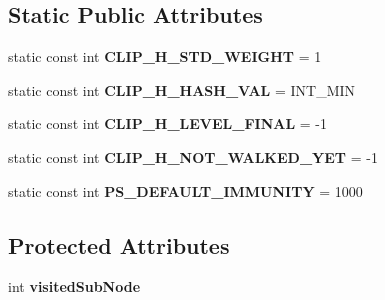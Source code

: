 \subsection*{Static Public Attributes}
\begin{DoxyCompactItemize}
\item 
\hypertarget{classkukadu_1_1Clip_a52b125d5ca75e6c980c4efb63e18ae4e}{static const int {\bfseries C\-L\-I\-P\-\_\-\-H\-\_\-\-S\-T\-D\-\_\-\-W\-E\-I\-G\-H\-T} = 1}\label{classkukadu_1_1Clip_a52b125d5ca75e6c980c4efb63e18ae4e}

\item 
\hypertarget{classkukadu_1_1Clip_aaf7152d14703b47492d656333809e38b}{static const int {\bfseries C\-L\-I\-P\-\_\-\-H\-\_\-\-H\-A\-S\-H\-\_\-\-V\-A\-L} = I\-N\-T\-\_\-\-M\-I\-N}\label{classkukadu_1_1Clip_aaf7152d14703b47492d656333809e38b}

\item 
\hypertarget{classkukadu_1_1Clip_a64b769588ddb7d317b0cd6de62c997d2}{static const int {\bfseries C\-L\-I\-P\-\_\-\-H\-\_\-\-L\-E\-V\-E\-L\-\_\-\-F\-I\-N\-A\-L} = -\/1}\label{classkukadu_1_1Clip_a64b769588ddb7d317b0cd6de62c997d2}

\item 
\hypertarget{classkukadu_1_1Clip_acecc38ad6aa9ffdb51d8f44ee8539b9e}{static const int {\bfseries C\-L\-I\-P\-\_\-\-H\-\_\-\-N\-O\-T\-\_\-\-W\-A\-L\-K\-E\-D\-\_\-\-Y\-E\-T} = -\/1}\label{classkukadu_1_1Clip_acecc38ad6aa9ffdb51d8f44ee8539b9e}

\item 
\hypertarget{classkukadu_1_1Clip_a70bbff7bc51184fe67545ce050590bce}{static const int {\bfseries P\-S\-\_\-\-D\-E\-F\-A\-U\-L\-T\-\_\-\-I\-M\-M\-U\-N\-I\-T\-Y} = 1000}\label{classkukadu_1_1Clip_a70bbff7bc51184fe67545ce050590bce}

\end{DoxyCompactItemize}
\subsection*{Protected Attributes}
\begin{DoxyCompactItemize}
\item 
\hypertarget{classkukadu_1_1Clip_a17bb4754cdf923cc3b3c9bc344ec9452}{int {\bfseries visited\-Sub\-Node}}\label{classkukadu_1_1Clip_a17bb4754cdf923cc3b3c9bc344ec9452}

\end{DoxyCompactItemize}
